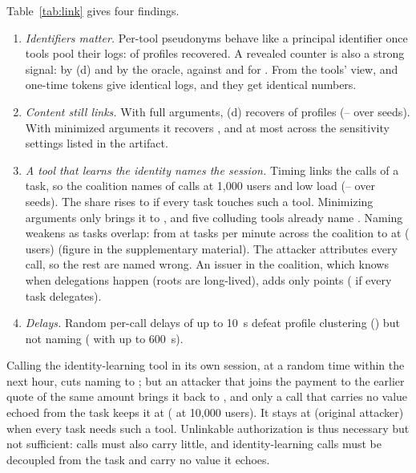 Table~\ref{tab:link} gives four findings.
\begin{enumerate}
\item \emph{Identifiers matter.} Per-tool pseudonyms behave like a principal identifier once tools pool their logs: \LinkPertoolReid{} of profiles recovered. A revealed counter is also a strong signal: \LinkPtejReid{} by (d) and \LinkPtejOracle{} by the oracle, against \LinkMMReid{} and \LinkMMUpper{} for \sys{}. From the tools' view, \sys{} and one-time tokens give identical logs, and they get identical numbers.
\item \emph{Content still links.} With full arguments, (d) recovers \LinkMMReid{} of profiles (\LinkMMReidLo{}--\LinkMMReidHi{} over seeds). With minimized arguments it recovers \LinkMMMinReid{}, and at most \LinkMMMinSensMax{} across the sensitivity settings listed in the artifact.
\item \emph{A tool that learns the identity names the session.} Timing links the calls of a task, so the coalition names \NameMM{} of \sys{} calls at 1{,}000 users and low load (\NameMMLo{}--\NameMMHi{} over seeds). The share rises to \NameMMEvery{} if every task touches such a tool. Minimizing arguments only brings it to \NameMMMin{}, and five colluding tools already name \CoalFiveName{}. Naming weakens as tasks overlap: from \NameLoadLo{} at \LoadRateMin{} tasks per minute across the coalition to \NameLoadHi{} at \NameLoadHiRate{} (\NameLoadHiUsers{} users) (figure in the supplementary material). The attacker attributes every call, so the rest are named wrong. An issuer in the coalition, which knows when delegations happen (roots are long-lived), adds only \IssNameInc{} points (\IssNameIncPdOne{} if every task delegates).
\item \emph{Delays.} Random per-call delays of up to 10~s defeat profile clustering (\JitDTen{}) but not naming (\JitNameSixHundred{} with up to 600~s).
\end{enumerate}
Calling the identity-learning tool in its own session, at a random time within the next hour, cuts naming to \NameDecHour{}; but an attacker that joins the payment to the earlier quote of the same amount brings it back to \NameDecHourAdapt{}, and only a call that carries no value echoed from the task keeps it at \NameDecHourFree{} (\NameDecHourFreeTenK{} at 10{,}000 users). It stays at \NameDecHourEvery{} (original attacker) when every task needs such a tool. Unlinkable authorization is thus necessary but not sufficient: calls must also carry little, and identity-learning calls must be decoupled from the task and carry no value it echoes.
